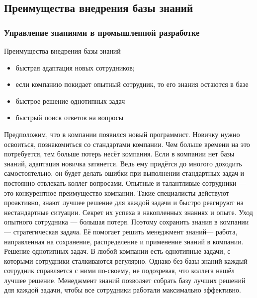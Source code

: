 \documentclass{industrial-development}
\begin{document}
\subsection{Преимущества внедрения базы знаний}

\begin{frame} \frametitle{Управление знаниями в промышленной разработке}
  \begin{block}{Преимущества внедрения базы знаний}
  \end{block}
  
  \begin{itemize}
  \item быстрая адаптация новых сотрудников;
  \item если компанию покидает опытный сотрудник, то его знания остаются в базе
  \item быстрое решение однотипных задач
  \item быстрый поиск ответов на вопросы
  \end{itemize}
\end{frame}

\lecturenotes
Предположим, что в компании появился новый программист. Новичку нужно освоиться, познакомиться со стандартами компании. Чем больше времени на это потребуется, тем больше потерь несёт компания. Если в компании нет базы знаний, адаптация новичка затянется. Ведь ему придётся до многого доходить самостоятельно, он будет делать ошибки при выполнении стандартных задач и постоянно отвлекать коллег вопросами.
Опытные и талантливые сотрудники — это конкурентное преимущество компании. Такие специалисты действуют проактивно, знают лучшее решение для каждой задачи и быстро реагируют на нестандартные ситуации. Секрет их успеха в накопленных знаниях и опыте. Уход опытного сотрудника — большая потеря. Поэтому сохранить знания в компании — стратегическая задача. Её помогает решить менеджмент знаний— работа, направленная на сохранение, распределение и применение знаний в компании. 
Решение однотипных задач. В любой компании есть однотипные задачи, с которыми сотрудники сталкиваются регулярно. Однако без базы знаний каждый сотрудник справляется с ними по-своему, не подозревая, что коллега нашёл лучшее решение. Менеджмент знаний позволяет собрать базу лучших решений для каждой задачи, чтобы все сотрудники работали максимально эффективно. 
\end{document}

